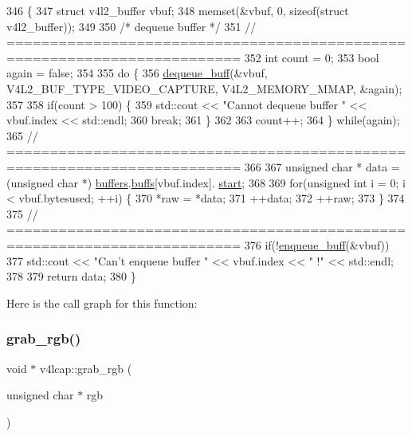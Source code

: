 \begin{DoxyCode}
346                                            \{
347     \textcolor{keyword}{struct }v4l2\_buffer vbuf;
348     memset(&vbuf, 0, \textcolor{keyword}{sizeof}(\textcolor{keyword}{struct} v4l2\_buffer));
349 
350     \textcolor{comment}{/* dequeue buffer */}
351     \textcolor{comment}{// =========================================================================}
352     \textcolor{keywordtype}{int} count = 0;
353     \textcolor{keywordtype}{bool} again = \textcolor{keyword}{false};
354 
355     \textcolor{keywordflow}{do} \{
356         \hyperlink{classv4lcap_a73678c131c1ac6c555be3ea125be08da}{dequeue\_buff}(&vbuf, V4L2\_BUF\_TYPE\_VIDEO\_CAPTURE, V4L2\_MEMORY\_MMAP, &again);
357 
358         \textcolor{keywordflow}{if}(count > 100) \{
359             std::cout << \textcolor{stringliteral}{"Cannot dequeue buffer "} << vbuf.index << std::endl;
360             \textcolor{keywordflow}{break};
361         \}
362 
363         count++;
364     \} \textcolor{keywordflow}{while}(again);
365     \textcolor{comment}{// =========================================================================}
366 
367     \textcolor{keywordtype}{unsigned} \textcolor{keywordtype}{char} * data = (\textcolor{keywordtype}{unsigned} \textcolor{keywordtype}{char} *) \hyperlink{classv4lcap_a046084072d2279bb204ed93cd2692700}{buffers}.\hyperlink{structv4lcap_1_1buffer__holder_afa53426fad11e19f7d615f564c979495}{buffs}[vbuf.index].
      \hyperlink{structv4lcap_1_1buffer_ae4fca9eb7724f4a93ee14537fb34597e}{start};
368 
369     \textcolor{keywordflow}{for}(\textcolor{keywordtype}{unsigned} \textcolor{keywordtype}{int} i = 0; i < vbuf.bytesused; ++i) \{
370         *raw = *data;
371         ++data;
372         ++raw;
373     \}
374 
375     \textcolor{comment}{// =========================================================================}
376     \textcolor{keywordflow}{if}(!\hyperlink{classv4lcap_a61dcacb5bb57a9f8c72d6942f46e9ddc}{enqueue\_buff}(&vbuf))
377         std::cout << \textcolor{stringliteral}{"Can't enqueue buffer "} << vbuf.index << \textcolor{stringliteral}{" !"} << std::endl;
378 
379     \textcolor{keywordflow}{return} data;
380 \}
\end{DoxyCode}
Here is the call graph for this function\+:
\mbox{\label{classv4lcap_a4ef7f2a17a32f5b89bf9ddce123a3b52}} 
\subsubsection{\texorpdfstring{grab\+\_\+rgb()}{grab\_rgb()}}
{\footnotesize\ttfamily void $\ast$ v4lcap\+::grab\+\_\+rgb (\begin{DoxyParamCaption}\item[{unsigned char $\ast$}]{rgb }\end{DoxyParamCaption})}



